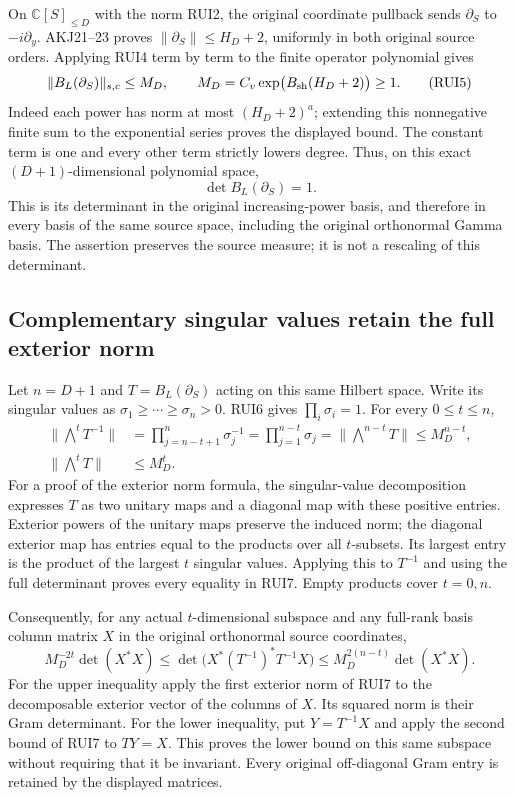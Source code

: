 \documentclass[11pt,a4paper]{article}
\begin{document}
On $\mathbb C[S]_{\le D}$ with the norm RUI2, the original
coordinate pullback sends $\partial_S$ to $-i\partial_y$.
AKJ21--23 proves $\|\partial_S\|\le H_D+2$, uniformly in both
original source orders. Applying RUI4 term by term to the finite
operator polynomial gives
\[
 \|B_L(\partial_S)\|_{s,c}\le M_D,
 \qquad M_D=C_v\exp\bigl(B_{\rm sh}(H_D+2)\bigr)\ge1.
 \tag{RUI5}
\]
Indeed each power has norm at most $(H_D+2)^a$; extending this
nonnegative finite sum to the exponential series proves the displayed
bound. The constant term is one and every other term strictly lowers
degree. Thus, on this exact $(D+1)$-dimensional polynomial space,
\[
 \det B_L(\partial_S)=1.
 \tag{RUI6}
\]
This is its determinant in the original increasing-power basis, and
therefore in every basis of the same source space, including the
original orthonormal Gamma basis. The assertion preserves the source
measure; it is not a rescaling of this determinant.

\subsection{Complementary singular values retain the full exterior norm}
Let $n=D+1$ and $T=B_L(\partial_S)$ acting on this same Hilbert space.
Write its singular values as $\sigma_1\ge\cdots\ge\sigma_n>0$.
RUI6 gives $\prod_i\sigma_i=1$. For every $0\le t\le n$,
\[
 \begin{split}
 \|\bigwedge^tT^{-1}\|
 &=\prod_{j=n-t+1}^n\sigma_j^{-1}
   =\prod_{j=1}^{n-t}\sigma_j
   =\|\bigwedge^{n-t}T\|
   \le M_D^{n-t},\\
 \|\bigwedge^tT\|&\le M_D^t.
 \end{split}\tag{RUI7}
\]
For a proof of the exterior norm formula, the singular-value
decomposition expresses $T$ as two unitary maps and a diagonal map
with these positive entries. Exterior powers of the unitary maps
preserve the induced norm; the diagonal exterior map has entries
equal to the products over all $t$-subsets. Its largest entry is the
product of the largest $t$ singular values. Applying this to $T^{-1}$
and using the full determinant proves every equality in RUI7. Empty
products cover $t=0,n$.

Consequently, for any actual $t$-dimensional subspace and any full-rank
basis column matrix $X$ in the original orthonormal source coordinates,
\[
 M_D^{-2t}\det(X^*X)
 \le\det\bigl(X^*(T^{-1})^*T^{-1}X\bigr)
 \le M_D^{2(n-t)}\det(X^*X).
 \tag{RUI8}
\]
For the upper inequality apply the first exterior norm of RUI7 to
the decomposable exterior vector of the columns of $X$. Its squared
norm is their Gram determinant. For the lower inequality, put
$Y=T^{-1}X$ and apply the second bound of RUI7 to $TY=X$.
This proves the lower bound on this same subspace without requiring
that it be invariant. Every original off-diagonal Gram entry is
retained by the displayed matrices.
\end{document}
